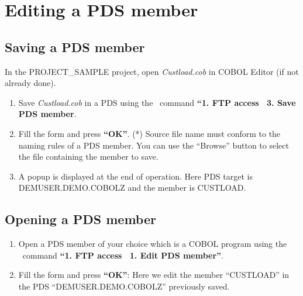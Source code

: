 \chapter*{Editing a PDS member}\label{chap:PDS}

\section{Saving a PDS member}

In the PROJECT\_SAMPLE project, open \textit{Custload.cob} in COBOL Editor (if not already done).

\begin{enumerate}
\item Save \textit{Custload.cob} in a PDS using the \mxproduct~command \textbf{``1. FTP access \RHD~3. Save PDS member}.

\item Fill the form and press \textbf{``OK''}.
(*) Source file name must conform to the naming rules of a PDS member. You can use the ``Browse'' button to select the file containing the member to save.

\item A popup is displayed at the end of operation.
Here PDS target is DEMUSER.DEMO.COBOLZ and the member is CUSTLOAD.
\end{enumerate}

\section{Opening a PDS member}

\begin{enumerate}
\item Open a PDS member of your choice which is a COBOL program using the \mxproduct~command \textbf{``1. FTP access \RHD~1. Edit PDS member''}.

\item Fill the form and press \textbf{``OK''}:
Here we edit the member ``CUSTLOAD'' in the PDS ``DEMUSER.DEMO.COBOLZ'' previously saved.
\end{enumerate}

